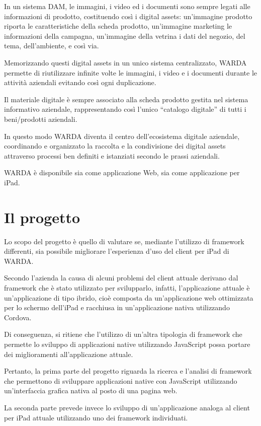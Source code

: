 In un sistema DAM, le immagini, i video ed i documenti sono sempre legati alle informazioni di prodotto, costituendo così i digital assets: un'immagine prodotto riporta le caratteristiche della scheda prodotto, un'immagine marketing le informazioni della campagna, un'immagine della vetrina i dati del negozio, del tema, dell'ambiente, e così via.

Memorizzando questi digital assets in un unico sistema centralizzato, WARDA permette di riutilizzare infinite volte le immagini, i video e i documenti durante le attività aziendali evitando così ogni duplicazione. 

Il materiale digitale è sempre associato alla scheda prodotto gestita nel sistema informativo aziendale, rappresentando così l'unico ``catalogo digitale'' di tutti i beni/prodotti aziendali.

In questo modo WARDA diventa il centro dell'ecosistema digitale aziendale, coordinando e organizzato la raccolta e la condivisione dei digital assets attraverso processi ben definiti e istanziati secondo le prassi aziendali.

WARDA è disponibile sia come applicazione Web, sia come applicazione per iPad.

\section{Il progetto}
Lo scopo del progetto è quello di valutare se, mediante l'utilizzo di framework differenti, sia possibile migliorare l'esperienza d'uso del client per iPad di WARDA.

Secondo l'azienda la causa di alcuni problemi del client attuale derivano dal framework che è stato utilizzato per svilupparlo, infatti, l'applicazione attuale è un'applicazione di tipo ibrido, cioè composta da un'applicazione web ottimizzata per lo schermo dell'iPad e racchiusa in un'applicazione nativa utilizzando \gls{Cordova}.

Di conseguenza, si ritiene che l'utilizzo di un'altra tipologia di framework che permette lo sviluppo di applicazioni native utilizzando JavaScript possa portare dei miglioramenti all'applicazione attuale.

Pertanto, la prima parte del progetto riguarda la ricerca e l'analisi di framework che permettono di sviluppare applicazioni native con JavaScript utilizzando un'interfaccia grafica nativa al posto di una pagina web.

La seconda parte prevede invece lo sviluppo di un'applicazione analoga al client per iPad attuale utilizzando uno dei framework individuati.
